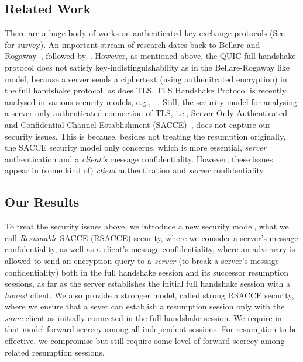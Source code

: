 \subsection{Related Work} \label{sec:Related Work}
There are a huge body of works on authenticated key
exchange protocols (See~\cite{CK01:AKE} for survey).
An important stream of research dates back to Bellare
and Rogaway~\cite{BR93:AKE}, followed by~\cite{DB96,
Blei98,JMDP00,JB02,EK09,KK05:TLS,KCRE08,SMOAJ08,KTT11,
Kraw01}.
However, as mentioned above, the QUIC full handshake
protocol does not satisfy key-indistinguishability as
in the Bellare-Rogaway like model, because a server
sends a ciphertext (using authenitcated encryption) in
the full handshake protocol, as does TLS.
TLS Handshake Protocol is recently analysed in various
security models, e.g., ~\cite{JKSS12:ACCE,KPW13:SACCE,
FS13:ACCE,GKS13:RACCE,BDKSS14:SSH,BFKPSB14:TLS}.
Still, the security model for analysing a server-only
authenticated connection of TLS, i.e., Server-Only
Authenticated and Confidential Channel Establishment
(SACCE)~\cite{KPW13:SACCE}, does not capture our
security issues.
This is because, besides not treating the resumption
originally, the SACCE security model only concerns,
which is more essential, \textit{server} authentication
and a \textit{client's} message confidentiality.
However, these issues appear in (some kind of)
\textit{client} authentication and \textit{server}
confidentiality.

\subsection{Our Results} \label{sec:proposal}

To treat the security issues above, we introduce a new
security model, what we call \textit{Resumable} SACCE
(RSACCE) security, where we consider a server's message
confidentiality, as well as a client's message
confidentiality, where an adversary is allowed to send
an encryption query to a \textit{server} (to break a
server's message confidentiality) both in the full
handshake session and its successor resumption sessions,
as far as the server establishes the initial full
handshake session with a \textit{honest} client.
We also provide a stronger model, called strong RSACCE
security, where we ensure that a sever can establish a
resumption session only with the \textit{same} client
as initially connected in the full handshake session.
We require in that model forward secrecy among all
independent sessions.
For resumption to be effective, we compromise but still
require some level of forward secrecy among related
resumption sessions.

